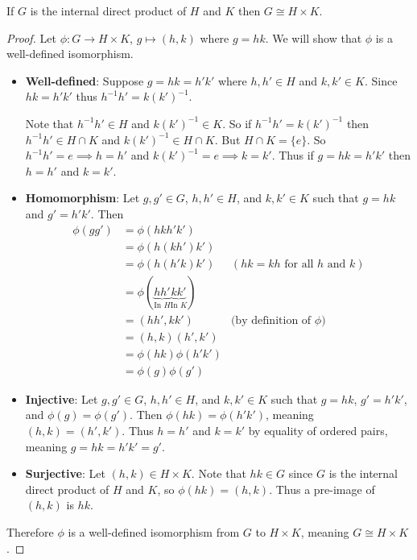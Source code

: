\begin{theorem}\label{thrm-direct-product-equivilance}
    If $G$ is the internal direct product of $H$ and $K$ then $G \cong H \times K$.
\end{theorem}
\begin{proof}
    Let $\phi: G \to H \times K$, $g \mapsto (h, k)$ where $g = hk$. We will show that $\phi$ is a well-defined isomorphism.
    \begin{itemize}
        \item \textbf{Well-defined}: Suppose $g = hk = h'k'$ where $h, h' \in H$ and $k, k' \in K$. Since $hk = h'k'$ thus $h^{-1}h' = k(k')^{-1}$.

        Note that $h^{-1}h' \in H$ and $k(k')^{-1} \in K$. So if $h^{-1}h' = k(k')^{-1}$ then $h^{-1}h' \in H \cap K$ and $k(k')^{-1} \in H \cap K$. But $H \cap K = \{e\}$. So $h^{-1}h' = e \implies h = h'$ and $k(k')^{-1} = e \implies k = k'$. Thus if $g = hk = h'k'$ then $h = h'$ and $k = k'$.
        
        \newpage
        
        \item \textbf{Homomorphism}: Let $g, g' \in G$, $h, h' \in H$, and $k, k' \in K$ such that $g = hk$ and $g' = h'k'$. Then
        \begin{align*}
            \phi(gg') &= \phi(hkh'k')\\
            &= \phi(h(kh')k')\\
            &= \phi(h(h'k)k') & (hk = kh \text{ for all } h \text{ and } k)\\
            &= \phi(\underbrace{hh'}_{\text{In }H}\underbrace{kk'}_{\text{In }K})\\
            &= (hh', kk') & \text{(by definition of }\phi)\\
            &= (h,k)(h',k')\\
            &= \phi(hk)\phi(h'k')\\
            &= \phi(g)\phi(g')
        \end{align*}
        \item \textbf{Injective}: Let $g, g' \in G$, $h, h' \in H$, and $k, k' \in K$ such that $g = hk$, $g' = h'k'$, and $\phi(g) = \phi(g')$. Then $\phi(hk) = \phi(h'k')$, meaning $(h,k) = (h',k')$. Thus $h = h'$ and $k = k'$ by equality of ordered pairs, meaning $g = hk = h'k' = g'$.
        \item \textbf{Surjective}: Let $(h, k) \in H \times K$. Note that $hk \in G$ since $G$ is the internal direct product of $H$ and $K$, so $\phi(hk) = (h, k)$. Thus a pre-image of $(h, k)$ is $hk$.
    \end{itemize}
    Therefore $\phi$ is a well-defined isomorphism from $G$ to $H \times K$, meaning $G \cong H \times K$.
\end{proof}



